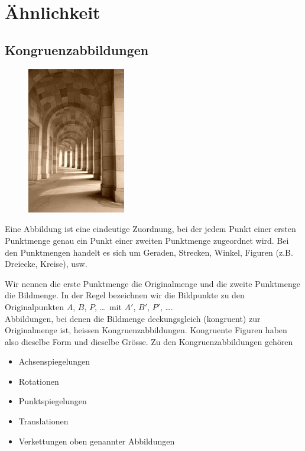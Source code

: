 \documentclass[%
11pt,%
twoside,%
titlepage,%
german,%
headsepline%
]{scrartcl}
\begin{document}
\clearpage

\section{Ähnlichkeit}

\subsection{Kongruenzabbildungen}
\begin{figure}
  \begin{center}
    \includegraphics[width=0.382\textwidth]{pictures/torbogen}
  \end{center}
\end{figure}
Eine Abbildung ist eine eindeutige Zuordnung, bei der jedem Punkt einer ersten Punktmenge genau ein Punkt einer zweiten Punktmenge zugeordnet wird. Bei den Punktmengen handelt es sich um Geraden, Strecken, Winkel, Figuren (z.B. Dreiecke, Kreise), usw.

Wir nennen die erste Punktmenge die Originalmenge und die zweite Punktmenge die Bildmenge. In der Regel bezeichnen wir die Bildpunkte zu den Originalpunkten $A$, $B$, $P$, \dots\ mit $A'$, $B'$, $P'$, \dots.\\

Abbildungen, bei denen die Bildmenge deckungsgleich (kongruent) zur Originalmenge ist, heissen Kongruenzabbildungen. Kongruente Figuren haben also dieselbe Form und dieselbe Gr\"osse. Zu den Kongruenzabbildungen geh\"oren
\begin{itemize}
\item Achsenspiegelungen
\item Rotationen
\item Punktspiegelungen
\item Translationen
\item Verkettungen oben genannter Abbildungen
\end{itemize}
\end{document}
